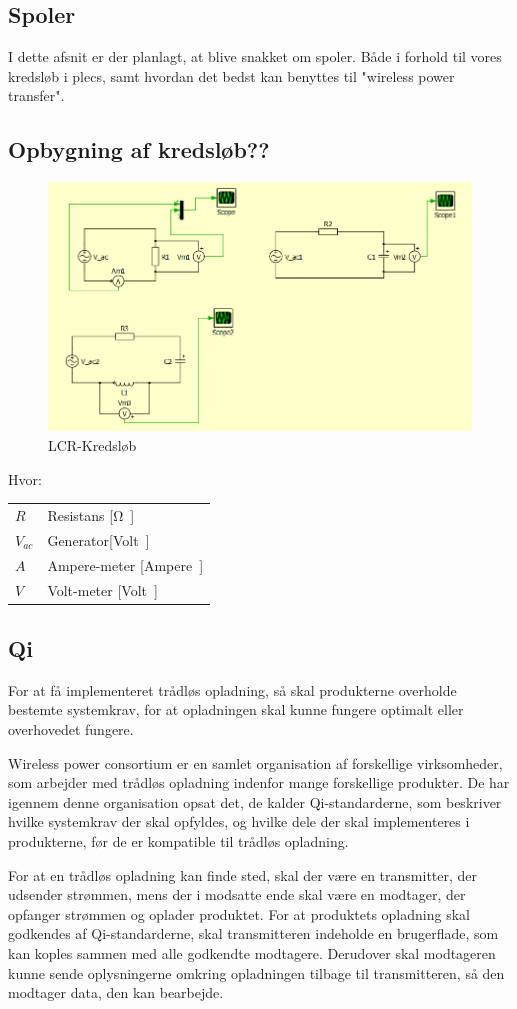 \subsection{Spoler}
I dette afsnit er der planlagt, at blive snakket om spoler. Både i forhold til vores kredsløb i plecs, samt hvordan det bedst kan benyttes til "wireless power transfer".
\newpage
\subsection{Opbygning af kredsløb??}
\begin{figure}[htbp]
	\centering
	\includegraphics[width=1\textwidth]{Vildledning/Schematics/Eks1_LCR.png}
	\caption{LCR-Kredsløb}
\end{figure}

Hvor:
\begin{table}[H]
	\begin{tabular}{l|l}
	$R$     & Resistans [\si \ohm] \\
	$V_{ac}$ 	   &  Generator[\si Volt] \\
	$A$ 	   & Ampere-meter [\si Ampere] \\
	$V$			& Volt-meter [\si Volt]
	\end{tabular}
\end{table}

\subsection{Qi}
For at få implementeret trådløs opladning, så skal produkterne overholde bestemte systemkrav, for at opladningen skal kunne fungere optimalt eller overhovedet fungere.

Wireless power consortium er en samlet organisation af forskellige virksomheder, som arbejder med trådløs opladning indenfor mange forskellige produkter. De har igennem denne organisation opsat det, de kalder Qi-standarderne, som beskriver hvilke systemkrav der skal opfyldes, og hvilke dele der skal implementeres i produkterne, før de er kompatible til trådløs opladning.

For at en trådløs opladning kan finde sted, skal der være en transmitter, der udsender strømmen, mens der i modsatte ende skal være en modtager, der opfanger strømmen og oplader produktet. For at produktets opladning skal godkendes af Qi-standarderne, skal transmitteren indeholde en brugerflade, som kan koples sammen med alle godkendte modtagere. Derudover skal modtageren kunne sende oplysningerne omkring opladningen tilbage til transmitteren, så den modtager data, den kan bearbejde.
